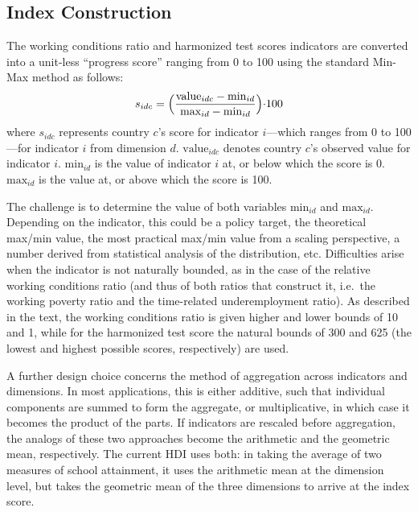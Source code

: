 \documentclass[
  a4paper, twoside, 12pt]{book}
\begin{document}

\setcounter{figure}{0}
\renewcommand{\thefigure}{A3.\arabic{figure}}
\setcounter{table}{0}
\renewcommand{\thetable}{A3.\arabic{table}}

\hypertarget{weights}{%
\subsection*{Index Construction}\label{weights}}


The working conditions ratio and harmonized test scores indicators are converted into a unit-less ``progress score'' ranging from 0 to 100 using the standard Min-Max method as follows:
\[ s_{idc}= \Bigl(\frac{\text{value}_{idc}- \text{min}_{id}}{ \text{max}_{id} - \text{min}_{id}} \Bigl) \cdot 100 \]
\vspace*{5pt}
where \(s_{idc}\) represents country \(c\)'s score for indicator \(i\)---which ranges from 0 to 100---for indicator \(i\) from dimension \(d\). \(\text{value}_{idc}\) denotes country \(c\)'s observed value for indicator \(i\). \(\text{min}_{id}\) is the value of indicator \(i\) at, or below which the score is 0. \(\text{max}_{id}\) is the value at, or above which the score is 100.

The challenge is to determine the value of both variables \(\text{min}_{id}\) and \(\text{max}_{id}\). Depending on the indicator, this could be a policy target, the theoretical max/min value, the most practical max/min value from a scaling perspective, a number derived from statistical analysis of the distribution, etc. Difficulties arise when the indicator is not naturally bounded, as in the case of the relative working conditions ratio (and thus of both ratios that construct it, i.e.~the working poverty ratio and the time-related underemployment ratio). As described in the text, the working conditions ratio is given higher and lower bounds of 10 and 1, while for the harmonized test score the natural bounds of 300 and 625 (the lowest and highest possible scores, respectively) are used.

A further design choice concerns the method of aggregation across indicators and dimensions. In most applications, this is either additive, such that individual components are summed to form the aggregate, or multiplicative, in which case it becomes the product of the parts. If indicators are rescaled before aggregation, the analogs of these two approaches become the arithmetic and the geometric mean, respectively. The current HDI uses both: in taking the average of two measures of school attainment, it uses the arithmetic mean at the dimension level, but takes the geometric mean of the three dimensions to arrive at the index score.
\end{document}

